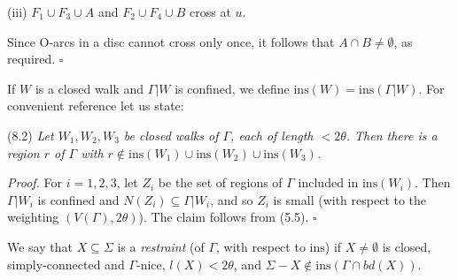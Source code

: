 \hspace*{12pt}(iii) $F_1 \cup F_3 \cup A$ and $F_2 \cup F_4 \cup B$ cross at $u$.

Since O-arcs in a disc cannot cross only once, it follows that $A \cap B \ne \emptyset$, as required. $\square$

If $W$ is a closed walk and $\Gamma | W$ is confined, we define $\mathrm{ins}(W) = \mathrm{ins}(\Gamma | W)$. For convenient reference let us state:

\stmt
(8.2) \textit{Let $W_1, W_2, W_3$ be closed walks of $\Gamma$, each of length $< 2\theta$. Then there is a region $r$ of $\Gamma$ with $r \notin \mathrm{ins}(W_1) \cup \mathrm{ins}(W_2) \cup \mathrm{ins}(W_3)$.}

\textit{Proof.} For $i = 1, 2, 3$, let $Z_i$ be the set of regions of $\Gamma$ included in $\mathrm{ins}(W_i)$. Then $\Gamma | W_i$ is confined and $N(Z_i) \subseteq \Gamma | W_i$, and so $Z_i$ is small (with respect to the weighting $(V(\Gamma), 2\theta)$). The claim follows from (5.5). $\square$

We say that $X \subseteq \Sigma$ is a \textit{restraint} (of $\Gamma$, with respect to $\mathrm{ins}$) if $X \ne \emptyset$ is closed, simply-connected and $\Gamma$-nice, $l(X) < 2\theta$, and $\Sigma - X \notin \mathrm{ins}(\Gamma \cap bd(X))$.
